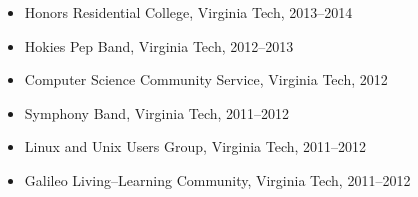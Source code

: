 \documentclass[11pt,letter,sans]{moderncv}
\begin{document}
    \begin{itemize}
  
    \item Honors Residential College, Virginia Tech, 2013--2014
  
    \item Hokies Pep Band, Virginia Tech, 2012--2013
  
    \item Computer Science Community Service, Virginia Tech, 2012
  
    \item Symphony Band, Virginia Tech, 2011--2012
  
    \item Linux and Unix Users Group, Virginia Tech, 2011--2012
  
    \item Galileo Living--Learning Community, Virginia Tech, 2011--2012
  
    \end{itemize}
\end{document}

